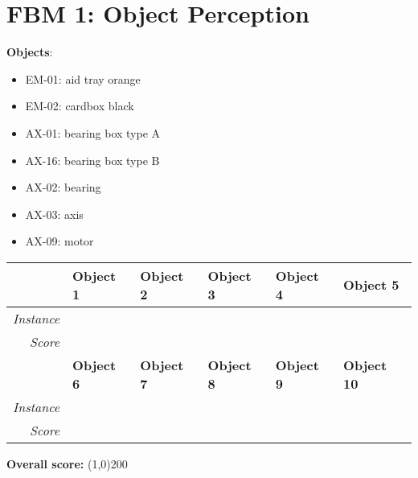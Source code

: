 \section*{FBM 1: Object Perception}


\vspace{0.3cm}

\noindent \textbf{Objects}:
\begin{itemize}
    \setlength\itemsep{0cm}
	\item EM-01: aid tray orange
	\item EM-02: cardbox black
	\item AX-01: bearing box type A
	\item AX-16: bearing box type B
	\item AX-02: bearing
	\item AX-03: axis
	\item AX-09: motor
\end{itemize}

\vspace{0.3cm}

\begin{tabular}{|r|l|l|l|l|l|}
\hline
         & \textbf{Object 1} & \textbf{Object 2}  & \textbf{Object 3}   & \textbf{Object 4}   & \textbf{Object 5} \\ \hline
\textit{Instance}	 &          &           &            &            &          \\ \hline
\textit{Score}	 &          &           &            &            &          \\ \hline

         & \textbf{Object 6}  & \textbf{Object 7}   & \textbf{Object 8}   & \textbf{Object 9}  & \textbf{Object 10}\\ \hline
\textit{Instance}	 &          &           &            &            &          \\ \hline
\textit{Score}	 &          &           &            &            &          \\ \hline
\end{tabular}

\vspace{0.3cm}

\begin{flushleft}
\textbf{Overall score:} \line(1,0){200}\\
\vspace{0.3cm}
\end{flushleft}




